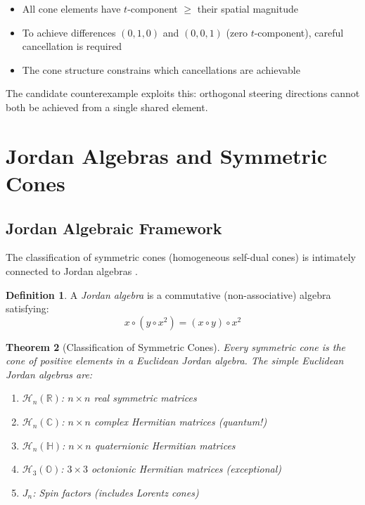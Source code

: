 \documentclass[11pt,a4paper]{article}
\newtheorem{theorem}{Theorem}[section]
\theoremstyle{definition}
\newtheorem{definition}[theorem]{Definition}
\newcommand{\R}{\mathbb{R}}
\newcommand{\Complex}{\mathbb{C}}
\begin{document}
\begin{itemize}
    \item All cone elements have $t$-component $\geq$ their spatial magnitude
    \item To achieve differences $(0,1,0)$ and $(0,0,1)$ (zero $t$-component), careful cancellation is required
    \item The cone structure constrains which cancellations are achievable
\end{itemize}

The candidate counterexample exploits this: orthogonal steering directions cannot both be achieved from a single shared element.

\section{Jordan Algebras and Symmetric Cones}

\subsection{Jordan Algebraic Framework}

The classification of symmetric cones (homogeneous self-dual cones) is intimately connected to Jordan algebras \cite{faraut1994analysis}.

\begin{definition}
A \emph{Jordan algebra} is a commutative (non-associative) algebra satisfying:
\[
x \circ (y \circ x^2) = (x \circ y) \circ x^2
\]
\end{definition}

\begin{theorem}[Classification of Symmetric Cones]
Every symmetric cone is the cone of positive elements in a Euclidean Jordan algebra. The simple Euclidean Jordan algebras are:
\begin{enumerate}
    \item $\mathcal{H}_n(\R)$: $n \times n$ real symmetric matrices
    \item $\mathcal{H}_n(\Complex)$: $n \times n$ complex Hermitian matrices (quantum!)
    \item $\mathcal{H}_n(\mathbb{H})$: $n \times n$ quaternionic Hermitian matrices
    \item $\mathcal{H}_3(\mathbb{O})$: $3 \times 3$ octonionic Hermitian matrices (exceptional)
    \item $J_n$: Spin factors (includes Lorentz cones)
\end{enumerate}
\end{theorem}
\end{document}
